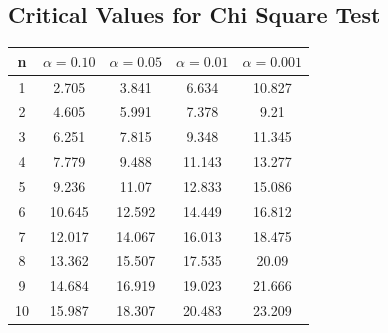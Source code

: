\documentclass[a4paper,12pt]{article}
\begin{document}
\subsection*{Critical Values for Chi Square Test}
{
	\Large
\begin{center}
\begin{tabular}{|c|c|c|c|c|}
	\hline 
n	&	$\alpha=0.10$	&	$\alpha=0.05$	&	$\alpha=0.01$	&	$\alpha=0.001$	\\ \hline
1	& 	2.705	&	3.841	&	6.634	&	10.827	\\ \hline
2	&	4.605	&	5.991	&	7.378	&	9.21	\\ \hline
3	&	6.251	&	7.815	&	9.348	&	11.345	\\ \hline
4	&	7.779	&	9.488	&	11.143	&	13.277	\\ \hline
5	&	9.236	&	11.07	&	12.833	&	15.086	\\ \hline
6	&	10.645	&	12.592	&	14.449	&	16.812	\\ \hline
7	&	12.017	&	14.067	&	16.013	&	18.475	\\ \hline
8	&	13.362	&	15.507	&	17.535	&	20.09	\\ \hline
9	&	14.684	&	16.919	&	19.023	&	21.666	\\ \hline
10	&	15.987	&	18.307	&	20.483	&	23.209	\\ \hline
\end{tabular} 
\end{center}
}

\end{document}
